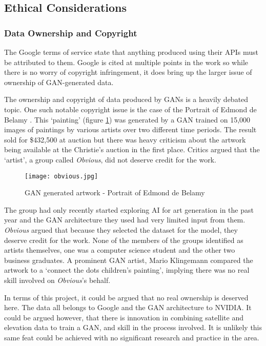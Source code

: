 \documentclass[a4paper]{report}
\begin{document}
\subsection{Ethical Considerations}
\subsubsection{Data Ownership and Copyright}
The Google terms of service state that anything produced using their APIs must be attributed to them. Google is cited at multiple points in the work so while there is no worry of copyright infringement, it does bring up the larger issue of ownership of GAN-generated data.

The ownership and copyright of data produced by GANs is a heavily debated topic. One such notable copyright issue is the case of the Portrait of Edmond de Belamy \cite{obvious}. This `painting' (figure \ref{fig:obvious}) was generated by a GAN trained on 15,000 images of paintings by various artists over two different time periods. The result sold for \$432,500 at auction but there was heavy criticism about the artwork being available at the Christie's auction in the first place. Critics argued that the `artist', a group called \textit{Obvious}, did not deserve credit for the work.

\begin{figure}[H]
    \centering
        \texttt{[image: obvious.jpg]}
        \caption{GAN generated artwork - Portrait of Edmond de Belamy}
        \label{fig:obvious}
\end{figure}

The group had only recently started exploring AI for art generation in the past year and the GAN architecture they used had very limited input from them. \textit{Obvious} argued that because they selected the dataset for the model, they deserve credit for the work. None of the members of the groups identified as artists themselves, one was a computer science student and the other two business graduates. A prominent GAN artist, Mario Klingemann compared the artwork to a  `connect the dots children's painting', implying there was no real skill involved on \textit{Obvious}'s behalf.

In terms of this project, it could be argued that no real ownership is deserved here. The data all belongs to Google and the GAN architecture to NVIDIA. It could be argued however, that there is innovation in combining satellite and elevation data to train a GAN, and skill in the process involved. It is unlikely this same feat could be achieved with no significant research and practice in the area.
\end{document}
